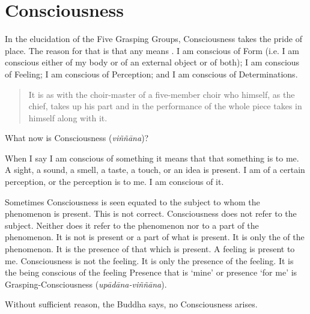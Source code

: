 \chapter{Consciousness}

In the elucidation of the Five Grasping Groups, Consciousness takes the pride of place. The reason for that is that any  means . I am conscious of Form (i.e. I am conscious either of my body or of an external object or of both); I am conscious of Feeling; I am conscious of Perception; and I am conscious of Determinations.

\begin{quote}
It is as with the choir-master of a five-member choir who himself, as the chief, takes up his part and in the performance of the whole piece takes in himself along with it.
\end{quote}

What now is Consciousness (\emph{viññāna})?

When I say I am conscious of something it means that that something is  to me. A sight, a sound, a smell, a taste, a touch, or an idea is present. I am  of a certain perception, or the perception is  to me. I am conscious of it.

Sometimes Consciousness is seen equated to the subject to whom the phenomenon is present. This is not correct. Consciousness does not refer to the subject. Neither does it refer to the phenomenon nor to a part of the phenomenon. It is not  is present or a part of what is present. It is only the  of the phenomenon. It is the presence of that which is present. A feeling is present to me. Consciousness is not the feeling. It is only the presence of the feeling. It is the being conscious of the feeling Presence that is `mine' or presence `for me' is Grasping-Consciousness (\emph{upādāna-viññāna}).

Without sufficient reason, the Buddha says, no Consciousness arises.

